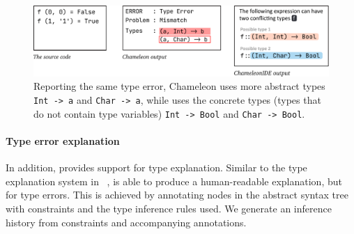 \begin{figure}
    \centering
    \includegraphics[width=\linewidth, trim=0mm 6mm 0mm 0mm]{images/compare-to-original.pdf}
    \caption{
Reporting the same type error, Chameleon uses more abstract types
\texttt{Int -> a} and \texttt{Char -> a}, while \chameleon{} uses the 
concrete types (types that do not contain type variables) \texttt{Int -> Bool} and \texttt{Char -> Bool}.
    }
    \label{fig:compare-to-original}
\end{figure}

 


\paragraph{Type error explanation}

In addition, \chameleon{} provides support for type explanation. Similar to the type explanation system  in ~\cite{jun_explaining_2002},  \chameleon{} is able to produce a human-readable explanation, but for type errors. This is achieved by annotating nodes in the abstract syntax tree with constraints and the type inference rules used. We generate an inference history from constraints and accompanying annotations. 


